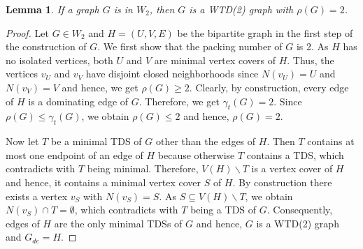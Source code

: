 \documentclass[11pt]{article}
\newtheorem{lemma}[theorem]{Lemma}
\theoremstyle{definition}
\begin{document}
\begin{lemma}\label{thm:w2arewtd2}
If a graph $G$ is in $W_2$, then $G$ is a WTD(2) graph with $\rho(G)=2$.
\end{lemma}
\begin{proof}
Let $G\in W_2$ and $H=(U,V,E)$ be the bipartite graph in the first step of the construction of $G$.
We first show that the packing number of $G$ is 2.
As $H$ has no isolated vertices, both $U$ and $V$ are minimal vertex covers of $H$.
Thus,
the vertices $v_U$ and $v_V$ have disjoint closed neighborhoods since $N(v_U)=U$ and $N(v_V)=V$ and hence, we get $\rho(G)\geq 2$. 
Clearly, by construction, every edge of $H$ is a dominating edge of $G$.
Therefore, we get $\gamma_t(G)=2$.
Since $\rho(G)\leq \gamma_t(G)$, we obtain $\rho (G) \leq 2$ and hence, $\rho(G)=2$.
	
Now let $T$ be a minimal TDS of $G$ other than the edges of $H$.
Then $T$ contains at most one endpoint of an edge of $H$ because otherwise $T$ contains a TDS, which contradicts with $T$ being minimal.
Therefore, $V(H)\backslash T$ is a vertex cover of $H$ and hence, it contains a minimal vertex cover $S$ of $H$.
By construction there exists a vertex $v_S$ with $N(v_S)=S$.
As $S\subseteq V(H)\backslash T$, we obtain $N(v_S)\cap T=\emptyset$, which contradicts with $T$ being a TDS of $G$.
Consequently, edges of $H$ are the only minimal TDSs of $G$ and hence,
$G$ is a WTD(2) graph and $G_{de}=H$.
\end{proof}
\end{document}
